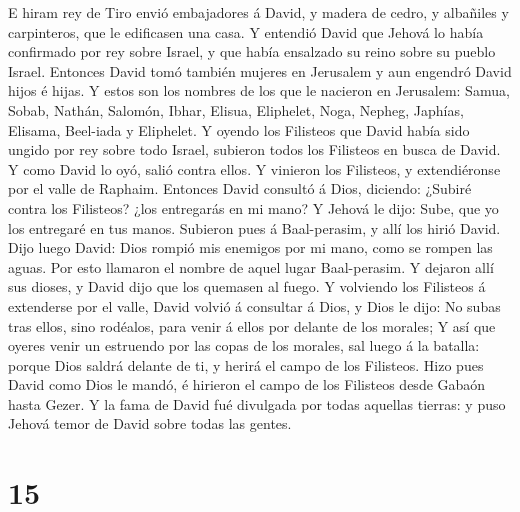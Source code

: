  E hiram rey de Tiro envió embajadores á David, y madera de
cedro, y albañiles y carpinteros, que le edificasen una casa.
 Y entendió David que Jehová lo había confirmado por rey
sobre Israel, y que había ensalzado su reino sobre su pueblo Israel.
 Entonces David tomó también mujeres en Jerusalem y aun
engendró David hijos é hijas.  Y estos son los nombres de
los que le nacieron en Jerusalem: Samua, Sobab, Nathán, Salomón,
 Ibhar, Elisua, Eliphelet,  Noga, Nepheg,
Japhías,  Elisama, Beel-iada y Eliphelet.  Y
oyendo los Filisteos que David había sido ungido por rey sobre todo
Israel, subieron todos los Filisteos en busca de David. Y como David lo
oyó, salió contra ellos.  Y vinieron los Filisteos, y
extendiéronse por el valle de Raphaim.  Entonces David
consultó á Dios, diciendo: ¿Subiré contra los Filisteos? ¿los entregarás
en mi mano? Y Jehová le dijo: Sube, que yo los entregaré en tus manos.
 Subieron pues á Baal-perasim, y allí los hirió David. Dijo
luego David: Dios rompió mis enemigos por mi mano, como se rompen las
aguas. Por esto llamaron el nombre de aquel lugar Baal-perasim.
 Y dejaron allí sus dioses, y David dijo que los quemasen
al fuego.  Y volviendo los Filisteos á extenderse por el
valle,  David volvió á consultar á Dios, y Dios le dijo: No
subas tras ellos, sino rodéalos, para venir á ellos por delante de los
morales;  Y así que oyeres venir un estruendo por las copas
de los morales, sal luego á la batalla: porque Dios saldrá delante de
ti, y herirá el campo de los Filisteos.  Hizo pues David
como Dios le mandó, é hirieron el campo de los Filisteos desde Gabaón
hasta Gezer.  Y la fama de David fué divulgada por todas
aquellas tierras: y puso Jehová temor de David sobre todas las gentes.

\hypertarget{section-14}{%
\section{15}\label{section-14}}

